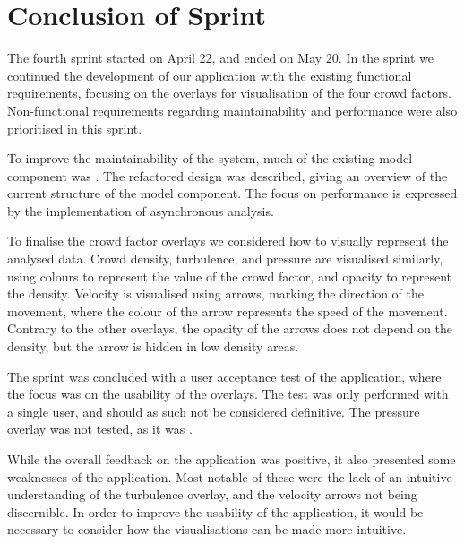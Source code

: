 \section{Conclusion of Sprint} \label{sec:s4_conclusion}
The fourth sprint started on April 22, and ended on May 20. In the sprint we continued the development of our application with the existing functional requirements, focusing on the overlays for visualisation of the four crowd factors. Non-functional requirements regarding maintainability and performance were also prioritised in this sprint.

To improve the maintainability of the system, much of the existing model component was . The refactored design was described, giving an overview of the current structure of the model component. The focus on performance is expressed by the implementation of asynchronous analysis.

To finalise the crowd factor overlays we considered how to visually represent the analysed data. Crowd density, turbulence, and pressure are visualised similarly, using colours to represent the value of the crowd factor, and opacity to represent the density. Velocity is visualised using arrows, marking the direction of the movement, where the colour of the arrow represents the speed of the movement. Contrary to the other overlays, the opacity of the arrows does not depend on the density, but the arrow is hidden in low density areas.

The sprint was concluded with a user acceptance test of the application, where the focus was on the usability of the overlays. The test was only performed with a single user, and should as such not be considered definitive. The pressure overlay was not tested, as it was .

While the overall feedback on the application was positive, it also presented some weaknesses of the application. Most notable of these were the lack of an intuitive understanding of the turbulence overlay, and the velocity arrows not being discernible. In order to improve the usability of the application, it would be necessary to consider how the visualisations can be made more intuitive.
